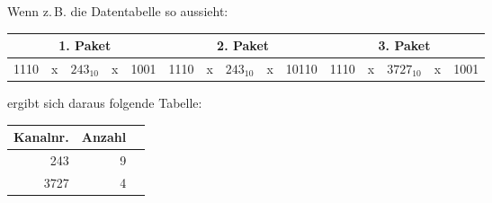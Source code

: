 \pagebreak

Wenn z.\,B. die Datentabelle so aussieht:

\begin{center}
    \begin{tabular}{|c|c|c|c|c|c|c|c|c|c|c|c|c|c|c|}
        \multicolumn{5}{c|}{1. Paket} & \multicolumn{5}{c|}{2. Paket} & \multicolumn{5}{c}{3. Paket}\\ \hline
        1110 & x & $243_{10}$ & x & 1001 & 1110 & x & $243_{10}$ & x & 10110 & 1110 & x & $3727_{10}$ & x & 1001 \\ \hline
    \end{tabular}
\end{center}

ergibt sich daraus folgende Tabelle:

\begin{center}
    \begin{tabular}{|r|r|l|}
        \hline
        Kanalnr. & Anzahl \\
        \hline
        \hline
        243 & 9 \\
        \hline
        3727 & 4 \\
        \hline
    \end{tabular}
\end{center}
